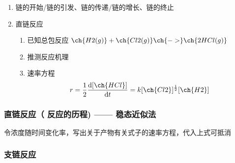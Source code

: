 \begin{enumerate}
    \item 链的开始/链的引发、链的传递/链的增长、链的终止
    \item 直链反应
    \begin{enumerate}
        \item 已知总包反应 $\ch{H2(g)} + \ch{Cl2(g)} \ch{->} \ch{2 HCl(g)}$
        \item 推测反应机理
        \item 速率方程
        \begin{equation*}
            r = \frac12 \frac{\mathrm{d}[\ch{HCl}]}{\mathrm{d}t} = k[\ch{Cl2}]^{\frac12}[\ch{H2}]
        \end{equation*}
    \end{enumerate}
\end{enumerate}

\subsubsection{直链反应（ 反应的历程) —— 稳态近似法}
令浓度随时间变化率，写出关于产物有关式子的速率方程，代入上式可抵消

\subsubsection{支链反应}